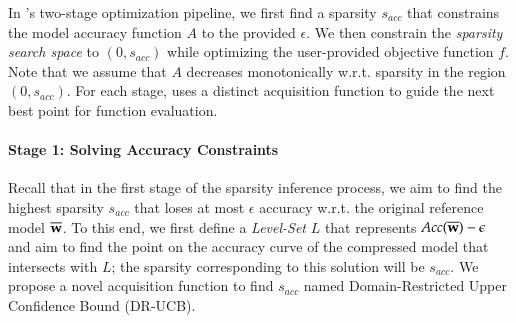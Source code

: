 \begin{comment}
\noindent \textit{4. Level-Set Optimization}. 
    In addition to unconstrained optimization, to enable \algoName to achieve constraint satisfaction we build on top of level-set black-box optimization~\cite{bogunovic2016truncated,garg2016tumor,zanette2018robust}.
    We leverage a Gaussian Process Adaptive Sampling criterion called Implicit Level Set Upper Confidence Bound (ILS-UCB)~\cite{garg2016tumor}, that prioritizes sampling near a level set of the estimate. 
This algorithm prioritizes searching the expected L-C curve intersection with user accuracy constraints, conditional on estimated uncertainty, and does not seek to precisely learn the shape of the entire L-C curve.
Intuitively, by reducing the estimation space to specifically localize the sparsity that meets user accuracy constraints, we can reduce the total number of measurements-and consequently the time required to achieve an optimal value for the sparsity.
Hence, rather than prioritizing both high variance and high mean like UCB, ILS-UCB prioritizes sampling in areas near a level set of the mean represented by the Gaussian Process Implicit Surface, i.e. to minimize the implicit potential defined by $\mu(\bx) - L$, and where the confidence interval is large:%
\begin{equation}
\bx_t = \underset{\bx \in X}{\text{argmax}}~(1 - \gamma) \sigma(\bx) - \gamma | \mu(\bx) - L|
\label{eq:ils}
\end{equation}

\end{comment}

In \algoName's two-stage optimization pipeline, we first find a sparsity $s_{acc}$ that constrains the model accuracy function $A$ to the provided $\epsilon$. We then constrain the {\em sparsity search space} to $(0, s_{acc})$ while optimizing the user-provided objective function $f$. Note that we assume that $A$ decreases monotonically w.r.t. sparsity in the region $(0, s_{acc})$.
For each stage, \algoName uses a distinct acquisition function
to guide the next best point for function evaluation.

\paragraph{Stage 1: Solving Accuracy Constraints}
Recall that in the first stage of the sparsity inference process, we aim to find the highest sparsity $s_{acc}$ that loses at most $\epsilon$ accuracy w.r.t. the original reference model $\overline{{\bf w}}$. To this end, we first define a {\em Level-Set} $L$ that represents $Acc(\overline{{\bf w}}) - \epsilon$ and aim to find the point on the accuracy curve of the compressed model that intersects with $L$; the sparsity corresponding to this solution will be $s_{acc}$. We propose a novel acquisition function to find $s_{acc}$ named Domain-Restricted Upper Confidence Bound (DR-UCB).

